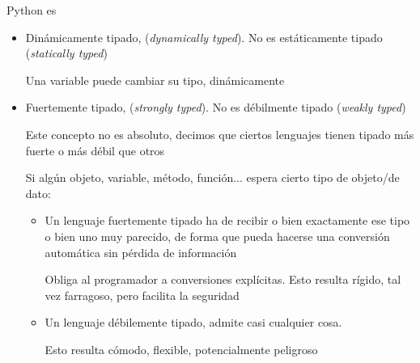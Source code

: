 \documentclass[ucs]{beamer}
\begin{document}
\begin{frame}[fragile]

Python es
\begin{itemize}
\item Dinámicamente tipado, (\emph{dynamically typed}). No es estáticamente tipado (\emph{statically typed})

Una variable puede cambiar su tipo, dinámicamente 
\item Fuertemente tipado, (\emph{strongly typed}). No es débilmente tipado (\emph{weakly typed})

Este concepto no es absoluto, decimos que ciertos lenguajes tienen tipado más fuerte
o más débil que otros 


Si algún objeto, variable, método, función... espera cierto tipo de objeto/de dato:


\begin{itemize}
\item
Un lenguaje fuertemente tipado ha de recibir o bien exactamente ese tipo o bien
uno muy parecido, de forma que pueda hacerse una conversión automática sin pérdida
de información

Obliga al programador a conversiones explícitas. Esto resulta rígido, tal vez
farragoso, pero facilita la seguridad
\item
Un lenguaje débilemente tipado, admite casi cualquier cosa.

Esto resulta cómodo, flexible, potencialmente peligroso
\end{itemize}
\end{itemize}


\end{frame}
\end{document}
